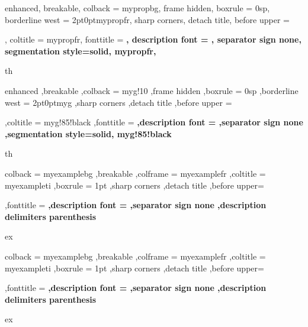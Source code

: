 {%
	enhanced,
	breakable,
	colback = mypropbg,
	frame hidden,
	boxrule = 0sp,
	borderline west = {2pt}{0pt}{mypropfr},
	sharp corners,
	detach title,
	before upper = \tcbtitle\par\smallskip,
	coltitle = mypropfr,
	fonttitle = \bfseries\sffamily,
	description font = \mdseries,
	separator sign none,
	segmentation style={solid, mypropfr},
}
{th}



{%
	enhanced
	,breakable
	,colback = myg!10
	,frame hidden
	,boxrule = 0sp
	,borderline west = {2pt}{0pt}{myg}
	,sharp corners
	,detach title
	,before upper = \tcbtitle\par\smallskip
	,coltitle = myg!85!black
	,fonttitle = \bfseries\sffamily
	,description font = \mdseries
	,separator sign none
	,segmentation style={solid, myg!85!black}
}
{th}




{%
	colback = myexamplebg
	,breakable
	,colframe = myexamplefr
	,coltitle = myexampleti
	,boxrule = 1pt
	,sharp corners
	,detach title
	,before upper=\tcbtitle\par\smallskip
	,fonttitle = \bfseries
	,description font = \mdseries
	,separator sign none
	,description delimiters parenthesis
}
{ex}

{%
	colback = myexamplebg
	,breakable
	,colframe = myexamplefr
	,coltitle = myexampleti
	,boxrule = 1pt
	,sharp corners
	,detach title
	,before upper=\tcbtitle\par\smallskip
	,fonttitle = \bfseries
	,description font = \mdseries
	,separator sign none
	,description delimiters parenthesis
}
{ex}


